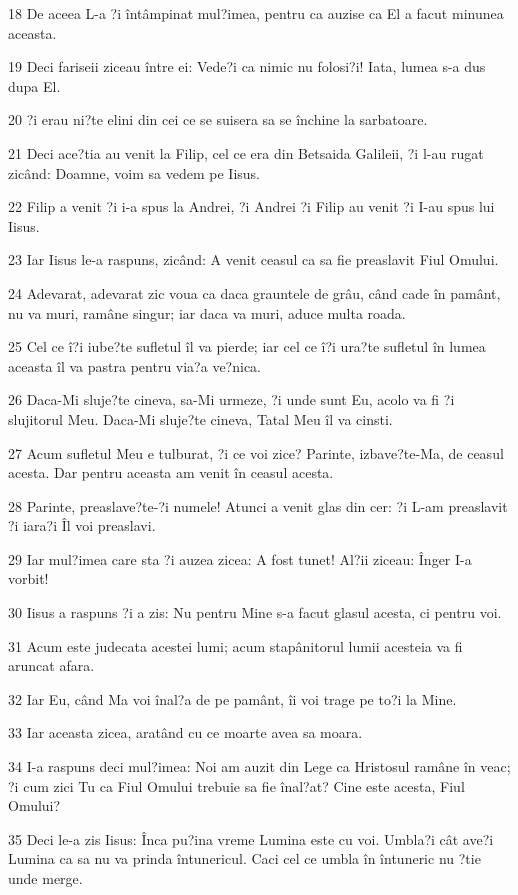 \par 18 De aceea L-a ?i întâmpinat mul?imea, pentru ca auzise ca El a facut minunea aceasta.
\par 19 Deci fariseii ziceau între ei: Vede?i ca nimic nu folosi?i! Iata, lumea s-a dus dupa El.
\par 20 ?i erau ni?te elini din cei ce se suisera sa se închine la sarbatoare.
\par 21 Deci ace?tia au venit la Filip, cel ce era din Betsaida Galileii, ?i l-au rugat zicând: Doamne, voim sa vedem pe Iisus.
\par 22 Filip a venit ?i i-a spus la Andrei, ?i Andrei ?i Filip au venit ?i I-au spus lui Iisus.
\par 23 Iar Iisus le-a raspuns, zicând: A venit ceasul ca sa fie preaslavit Fiul Omului.
\par 24 Adevarat, adevarat zic voua ca daca grauntele de grâu, când cade în pamânt, nu va muri, ramâne singur; iar daca va muri, aduce multa roada.
\par 25 Cel ce î?i iube?te sufletul îl va pierde; iar cel ce î?i ura?te sufletul în lumea aceasta îl va pastra pentru via?a ve?nica.
\par 26 Daca-Mi sluje?te cineva, sa-Mi urmeze, ?i unde sunt Eu, acolo va fi ?i slujitorul Meu. Daca-Mi sluje?te cineva, Tatal Meu îl va cinsti.
\par 27 Acum sufletul Meu e tulburat, ?i ce voi zice? Parinte, izbave?te-Ma, de ceasul acesta. Dar pentru aceasta am venit în ceasul acesta.
\par 28 Parinte, preaslave?te-?i numele! Atunci a venit glas din cer: ?i L-am preaslavit ?i iara?i Îl voi preaslavi.
\par 29 Iar mul?imea care sta ?i auzea zicea: A fost tunet! Al?ii ziceau: Înger I-a vorbit!
\par 30 Iisus a raspuns ?i a zis: Nu pentru Mine s-a facut glasul acesta, ci pentru voi.
\par 31 Acum este judecata acestei lumi; acum stapânitorul lumii acesteia va fi aruncat afara.
\par 32 Iar Eu, când Ma voi înal?a de pe pamânt, îi voi trage pe to?i la Mine.
\par 33 Iar aceasta zicea, aratând cu ce moarte avea sa moara.
\par 34 I-a raspuns deci mul?imea: Noi am auzit din Lege ca Hristosul ramâne în veac; ?i cum zici Tu ca Fiul Omului trebuie sa fie înal?at? Cine este acesta, Fiul Omului?
\par 35 Deci le-a zis Iisus: Înca pu?ina vreme Lumina este cu voi. Umbla?i cât ave?i Lumina ca sa nu va prinda întunericul. Caci cel ce umbla în întuneric nu ?tie unde merge.
